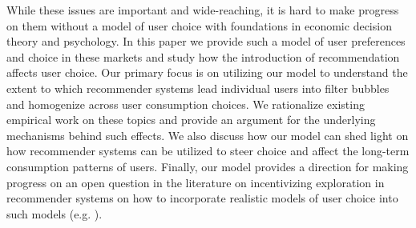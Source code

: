 \documentclass[format=acmsmall, review=false]{acmart}
\begin{document}
\par
While these issues are important and wide-reaching, it is hard to make progress on them without a model of user choice with foundations in economic decision theory and psychology. In this paper we provide such a model of user preferences and choice in these markets and study how the introduction of recommendation affects user choice. Our primary focus is on utilizing our model to understand the extent to which recommender systems lead individual users into filter bubbles and homogenize across user consumption choices. We rationalize existing empirical work on these topics and provide an argument for the underlying mechanisms behind such effects. We also discuss how our model can shed light on how recommender systems can be utilized to steer choice and affect the long-term consumption patterns of users. Finally, our model provides a direction for making progress on an open question in the literature on incentivizing exploration in recommender systems on how to incorporate realistic models of user choice into such models (e.g. \citep{immorlica2018incentivizing}).
\end{document}
